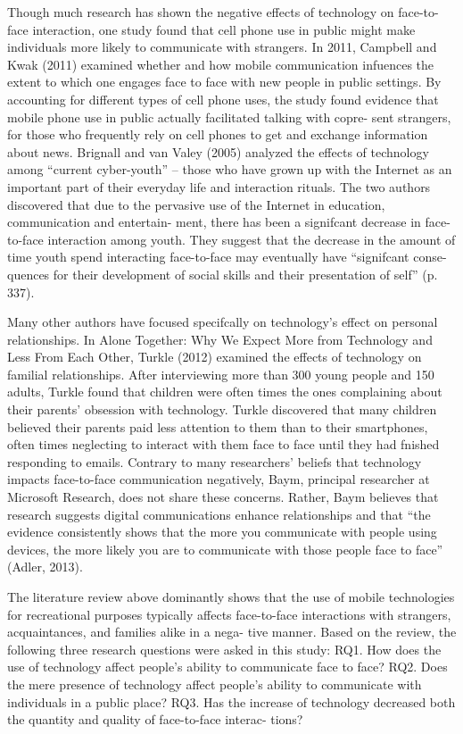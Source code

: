 \documentclass[11pt]{article} %
\begin{document}
Though much research has shown the negative effects of technology on face-to-face interaction, one 
study found that cell phone use in public might make individuals more likely to communicate with strangers. 
In 2011, Campbell and Kwak (2011) examined whether and how mobile communication infuences the extent 
to which one engages face to face with new people in public settings. By accounting for different types of cell 
phone uses, the study found evidence that mobile phone use in public actually facilitated talking with copre-
sent strangers, for those who frequently rely on cell phones to get and exchange information about news.
Brignall and van Valey (2005) analyzed the effects of technology among “current cyber-youth” – those 
who have grown up with the Internet as an important part of their everyday life and interaction rituals. The two 
authors discovered that due to the pervasive use of the Internet in education, communication and entertain-
ment, there has been a signifcant decrease in face-to-face interaction among youth. They suggest that the 
decrease in the amount of time youth spend interacting face-to-face may eventually have “signifcant conse-
quences for their development of social skills and their presentation of self” (p. 337). 

Many other authors have focused specifcally on technology’s effect on personal relationships. In  
Alone Together: Why We Expect More from Technology and Less From Each Other,  Turkle (2012) examined 
the effects of technology on familial relationships. After interviewing more than 300 young people and 150 
adults, Turkle found that children were often times the ones complaining about their parents’ obsession with 
technology. Turkle discovered that many children believed their parents paid less attention to them than to 
their smartphones, often times neglecting to interact with them face to face until they had fnished responding 
to emails.
Contrary to many researchers’ beliefs that technology impacts face-to-face communication negatively, 
Baym, principal researcher at Microsoft Research, does not share these concerns. Rather, Baym believes 
that research suggests digital communications enhance relationships and that “the evidence consistently 
shows that the more you communicate with people using devices, the more likely you are to communicate 
with those people face to face” (Adler, 2013).

The literature review above dominantly shows that the use of mobile technologies for recreational purposes typically affects face-to-face interactions with strangers, acquaintances, and families alike in a nega-
tive manner. Based on the review, the following three research questions were asked in this study:
RQ1. How does the use of technology affect people’s ability to communicate face to face? 
RQ2. Does the mere presence of technology affect people’s ability to communicate with individuals in 
a public place?
RQ3. Has the increase of technology decreased both the quantity and quality of face-to-face interac-
tions?
\end{document}
